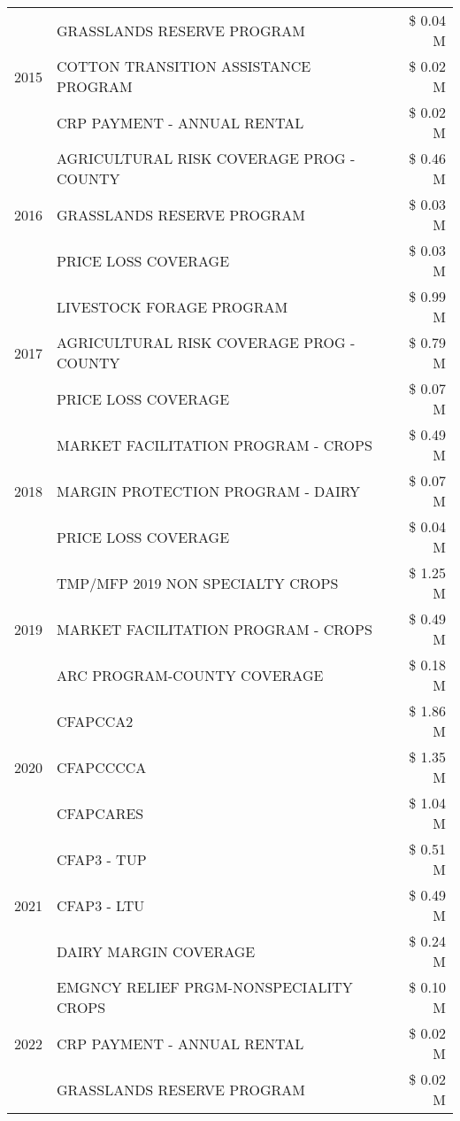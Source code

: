 \begin{tabular}{llr}
\cline{1-3}
\multirow[t]{3}{*}{2015} & GRASSLANDS RESERVE PROGRAM & \$ 0.04 M \\
 & COTTON TRANSITION ASSISTANCE PROGRAM & \$ 0.02 M \\
 & CRP PAYMENT - ANNUAL RENTAL & \$ 0.02 M \\
\cline{1-3}
\multirow[t]{3}{*}{2016} & AGRICULTURAL RISK COVERAGE PROG - COUNTY & \$ 0.46 M \\
 & GRASSLANDS RESERVE PROGRAM & \$ 0.03 M \\
 & PRICE LOSS COVERAGE & \$ 0.03 M \\
\cline{1-3}
\multirow[t]{3}{*}{2017} & LIVESTOCK FORAGE PROGRAM & \$ 0.99 M \\
 & AGRICULTURAL RISK COVERAGE PROG - COUNTY & \$ 0.79 M \\
 & PRICE LOSS COVERAGE & \$ 0.07 M \\
\cline{1-3}
\multirow[t]{3}{*}{2018} & MARKET FACILITATION PROGRAM - CROPS & \$ 0.49 M \\
 & MARGIN PROTECTION PROGRAM - DAIRY & \$ 0.07 M \\
 & PRICE LOSS COVERAGE & \$ 0.04 M \\
\cline{1-3}
\multirow[t]{3}{*}{2019} & TMP/MFP 2019 NON SPECIALTY CROPS & \$ 1.25 M \\
 & MARKET FACILITATION PROGRAM - CROPS & \$ 0.49 M \\
 & ARC PROGRAM-COUNTY COVERAGE & \$ 0.18 M \\
\cline{1-3}
\multirow[t]{3}{*}{2020} & CFAPCCA2 & \$ 1.86 M \\
 & CFAPCCCCA & \$ 1.35 M \\
 & CFAPCARES & \$ 1.04 M \\
\cline{1-3}
\multirow[t]{3}{*}{2021} & CFAP3 - TUP & \$ 0.51 M \\
 & CFAP3 - LTU & \$ 0.49 M \\
 & DAIRY MARGIN COVERAGE & \$ 0.24 M \\
\cline{1-3}
\multirow[t]{3}{*}{2022} & EMGNCY RELIEF PRGM-NONSPECIALITY CROPS & \$ 0.10 M \\
 & CRP PAYMENT - ANNUAL RENTAL & \$ 0.02 M \\
 & GRASSLANDS RESERVE PROGRAM & \$ 0.02 M \\
\cline{1-3}
\bottomrule
\end{tabular}
